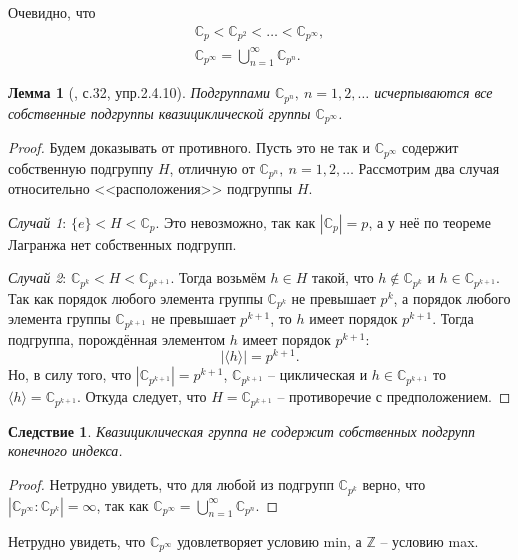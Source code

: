 \documentclass{article}
\newtheorem{corollary}{Следствие}[section]
\newtheorem{lemma}{Лемма}[section]
\begin{document}
Очевидно, что
\begin{gather*}
    \mathbb{C}_p < \mathbb{C}_{p^2} < \ldots < \mathbb{C}_{p^\infty}, \\
    \mathbb{C}_{p^\infty} = \bigcup_{n = 1}^{\infty} \mathbb{C}_{p^n}.
\end{gather*}

\begin{lemma}[\cite{kargapolov}, с.32, упр.2.4.10] \label{cniow}
    Подгруппами $\mathbb{C}_{p^n}, \ n = 1, 2, \ldots$ исчерпываются все собственные подгруппы квазициклической группы $\mathbb{C}_{p^\infty}$.
\end{lemma}
\begin{proof}
    Будем доказывать от противного. Пусть это не так и $\mathbb{C}_{p^\infty}$ содержит собственную подгруппу $H$, отличную от $\mathbb{C}_{p^n}, \ n = 1, 2, \ldots$
    Рассмотрим два случая относительно <<расположения>> подгруппы $H$.
    
    \textit{Случай 1}: $\{e \} < H < \mathbb{C}_p$. Это невозможно, так как $|\mathbb{C}_p| = p$, а у неё по теореме Лагранжа нет собственных подгрупп.

    \textit{Случай 2}: $ \mathbb{C}_{p^k} < H < \mathbb{C}_{p^{k + 1}} $. Тогда возьмём $h \in H$ такой, что $ h \notin \mathbb{C}_{p^k} $ и $h \in \mathbb{C}_{p^{k + 1}}$. Так как порядок любого элемента группы $\mathbb{C}_{p^k}$ не превышает $p^k$, а порядок любого элемента группы $\mathbb{C}_{p^{k + 1}}$ не превышает $p^{k + 1}$, то $h$ имеет порядок $p^{k + 1}$. Тогда подгруппа, порождённая элементом $h$ имеет порядок $p^{k + 1}$: $$ |\langle h \rangle| = p^{k + 1}. $$
    Но, в силу того, что $|\mathbb{C}_{p^{k + 1}}| = p^{k + 1}$, $\mathbb{C}_{p^{k + 1}}$ -- циклическая и $h \in \mathbb{C}_{p^{k + 1}}$ то $\langle h \rangle = \mathbb{C}_{p^{k + 1}}$. Откуда следует, что $H = \mathbb{C}_{p^{k + 1}}$ -- противоречие с предположением.
\end{proof}


\begin{corollary}
    Квазициклическая группа не содержит собственных подгрупп конечного индекса.
\end{corollary}
\begin{proof}
    Нетрудно увидеть, что для любой из подгрупп $\mathbb{C}_{p^k}$ верно, что $|\mathbb{C}_{p^\infty} : \mathbb{C}_{p^k}| = \infty$, так как $\mathbb{C}_{p^\infty} = \bigcup_{n = 1}^{\infty} \mathbb{C}_{p^n}$.
\end{proof}

Нетрудно увидеть, что $\mathbb{C}_{p^\infty}$ удовлетворяет условию min, а $\mathbb{Z}$ -- условию max.
\end{document}
